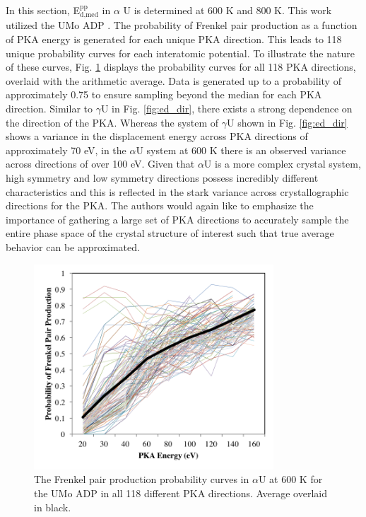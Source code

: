 \documentclass[review]{elsarticle}
\begin{document}
In this section, E$^{\textrm{pp}}_{\textrm{d,med}}$ in $\alpha$ U is determined at 600 K and 800 K. This work utilized the UMo ADP \cite{smirnovaADP}. The probability of Frenkel pair production as a function of PKA energy is generated for each unique PKA direction. This leads to 118 unique probability curves for each interatomic potential. To illustrate the nature of these curves, Fig. \ref{fig:ed_diralpha} displays the probability curves for all 118 PKA directions, overlaid with the arithmetic average. Data is generated up to a probability of approximately 0.75 to ensure sampling beyond the median for each PKA direction. Similar to $\gamma$U in Fig. \ref{fig:ed_dir}, there exists a strong dependence on the direction of the PKA. Whereas the system of $\gamma$U shown in Fig. \ref{fig:ed_dir} shows a variance in the displacement energy across PKA directions of approximately 70 eV, in the $\alpha$U system at 600 K there is an observed variance across directions of over 100 eV. Given that $\alpha$U is a more complex crystal system, high symmetry and low symmetry directions possess incredibly different characteristics and this is reflected in the stark variance across crystallographic directions for the PKA. The authors would again like to emphasize the importance of gathering a large set of PKA directions to accurately sample the entire phase space of the crystal structure of interest such that true average behavior can be approximated. 

\begin{figure}[h]
 \centering
 \includegraphics[width=0.8\textwidth]{ed_dir_allD_alpha.png} 
 \caption{The Frenkel pair production probability curves in $\alpha$U at 600 K for the UMo ADP in all 118 different PKA directions. Average overlaid in black.}
 \label{fig:ed_diralpha}
\end{figure}
\end{document}
